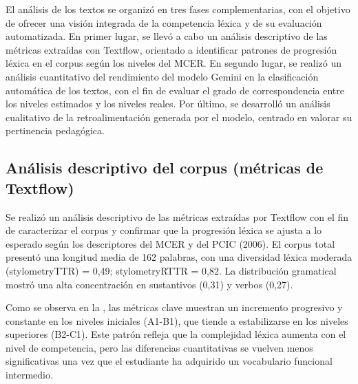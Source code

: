 \documentclass[spanish]{textolivre}
\begin{document}
El análisis de los textos se organizó en tres fases complementarias, con el objetivo de ofrecer una visión integrada de la competencia léxica y de su evaluación automatizada. En primer lugar, se llevó a cabo un análisis descriptivo de las métricas extraídas con Textflow, orientado a identificar patrones de progresión léxica en el corpus según los niveles del MCER. En segundo lugar, se realizó un análisis cuantitativo del rendimiento del modelo Gemini en la clasificación automática de los textos, con el fin de evaluar el grado de correspondencia entre los niveles estimados y los niveles reales. Por último, se desarrolló un análisis cualitativo de la retroalimentación generada por el modelo, centrado en valorar su pertinencia pedagógica.

\subsection{Análisis descriptivo del corpus (métricas de Textflow)}
Se realizó un análisis descriptivo de las métricas extraídas por Textflow con el fin de caracterizar el corpus y confirmar que la progresión léxica se ajusta a lo esperado según los descriptores del MCER y del PCIC (2006). El corpus total presentó una longitud media de 162 palabras, con una diversidad léxica moderada (stylometryTTR) = 0,49; stylometryRTTR = 0,82. La distribución gramatical mostró una alta concentración en sustantivos (0,31) y verbos (0,27).

Como se observa en la  , las métricas clave muestran un incremento progresivo y constante en los niveles iniciales (A1-B1), que tiende a estabilizarse en los niveles superiores (B2-C1). Este patrón refleja que la complejidad léxica aumenta con el nivel de competencia, pero las diferencias cuantitativas se vuelven menos significativas una vez que el estudiante ha adquirido un vocabulario funcional intermedio.
\end{document}
